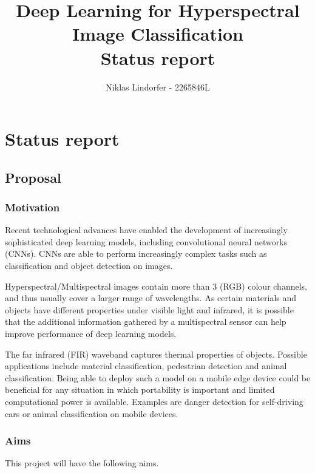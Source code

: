 \documentclass[11pt]{article}
\title{
    Deep Learning for Hyperspectral Image Classification \\
    \large{Status report}
}
\author{Niklas Lindorfer - 2265846L}
\begin{document}
\maketitle


\section{Status report}

\subsection{Proposal}\label{proposal}

\subsubsection{Motivation}\label{motivation}

Recent technological advances have enabled the development of increasingly sophisticated deep learning models, including convolutional neural networks (CNNs). 
CNNs are able to perform increasingly complex tasks such as classification and object detection on images.

Hyperspectral/Multispectral images contain more than 3 (RGB) colour channels, and thus usually cover a larger range of wavelengths. As certain materials and objects have different properties under visible light and infrared, it is possible that the additional information gathered by a multispectral sensor can help improve performance of deep learning models.

The far infrared (FIR) waveband captures thermal properties of objects. Possible applications include material classification, pedestrian detection and animal classification. Being able to deploy such a model on a mobile edge device could be beneficial for any situation in which portability is important and limited computational power is available. Examples are danger detection for self-driving cars or animal classification on mobile devices.

\subsubsection{Aims}\label{aims}

This project will have the following aims.
\end{document}
